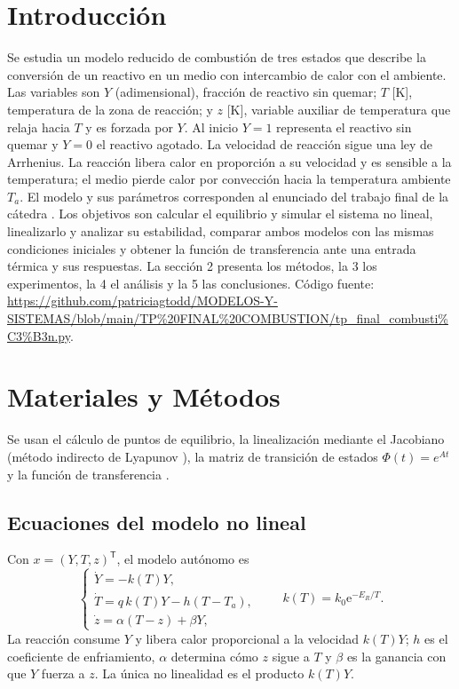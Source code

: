 \documentclass[11pt,a4paper]{article}
\newcommand{\e}{\mathrm{e}}
\begin{document}
\section{Introducción}
Se estudia un modelo reducido de combustión de tres estados que describe la conversión de un reactivo en un medio con intercambio de calor con el ambiente. Las variables son $Y$ (adimensional), fracción de reactivo sin quemar; $T$ [K], temperatura de la zona de reacción; y $z$ [K], variable auxiliar de temperatura que relaja hacia $T$ y es forzada por $Y$. Al inicio $Y=1$ representa el reactivo sin quemar y $Y=0$ el reactivo agotado.
La velocidad de reacción sigue una ley de Arrhenius. La reacción libera calor en proporción a su velocidad y es sensible a la temperatura; el medio pierde calor por convección hacia la temperatura ambiente $T_a$. El modelo y sus parámetros corresponden al enunciado del trabajo final de la cátedra \cite{Catedra}.
Los objetivos son calcular el equilibrio y simular el sistema no lineal, linealizarlo y analizar su estabilidad, comparar ambos modelos con las mismas condiciones iniciales y obtener la función de transferencia ante una entrada térmica y sus respuestas. La sección 2 presenta los métodos, la 3 los experimentos, la 4 el análisis y la 5 las conclusiones. Código fuente: \url{https://github.com/patriciagtodd/MODELOS-Y-SISTEMAS/blob/main/TP\%20FINAL\%20COMBUSTION/tp_final_combusti\%C3\%B3n.py}.
\section{Materiales y Métodos}
Se usan el cálculo de puntos de equilibrio, la linealización mediante el Jacobiano (método indirecto de Lyapunov \cite{Khalil}), la matriz de transición de estados $\Phi(t)=e^{At}$ y la función de transferencia \cite{Ogata}.
\subsection{Ecuaciones del modelo no lineal}
Con $x=(Y,T,z)^\mathsf{T}$, el modelo autónomo es
\begin{equation}\label{eq:system}
\begin{cases}
\dot{Y}=-k(T)Y,\\
\dot{T}=q\,k(T)Y-h(T-T_a),\\
\dot{z}=\alpha(T-z)+\beta Y,
\end{cases}
\qquad k(T)=k_0\e^{-E_R/T}.
\end{equation}
La reacción consume $Y$ y libera calor proporcional a la velocidad $k(T)Y$; $h$ es el coeficiente de enfriamiento, $\alpha$ determina cómo $z$ sigue a $T$ y $\beta$ es la ganancia con que $Y$ fuerza a $z$. La única no linealidad es el producto $k(T)Y$.
\end{document}
